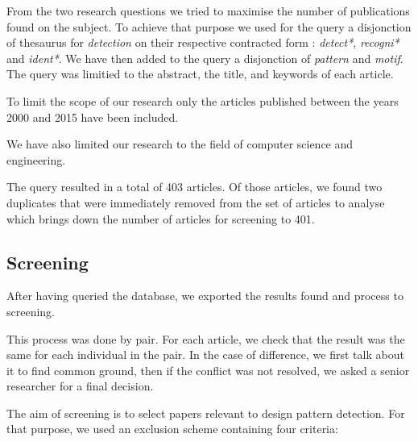 \documentclass[letterpaper, 10 pt, conference]{ieeeconf}  %
\begin{document}
From the two research questions we tried to maximise the number of publications
found on the subject.
To achieve that purpose we used for the query a disjonction of thesaurus for
\textit{detection} on their respective contracted form : \textit{detect*},
\textit{recogni*} and \textit{ident*}.
We have then added to the query a disjonction of \textit{pattern} and \textit{motif}.
The query was limitied to the abstract, the title, and keywords of each article.

To limit the scope of our research only the articles published between the years
2000 and 2015 have been included. 

We have also limited our research to the field of computer science and
engineering.

The query resulted in a total of 403 articles.
Of those articles, we found two duplicates that were immediately removed from
the set of articles to analyse which brings down the number of articles for
screening to 401.

\subsection{Screening}

After having queried the database, we exported the results found and process to
screening. 

This process was done by pair.
For each article, we check that the result was the same for each individual in
the pair.
In the case of difference, we first talk about it to find common ground, then
if the conflict was not resolved, we asked a senior researcher for a final
decision.

The aim of screening is to select papers relevant to design pattern detection.
For that purpose, we used an exclusion scheme containing four criteria:
\end{document}
